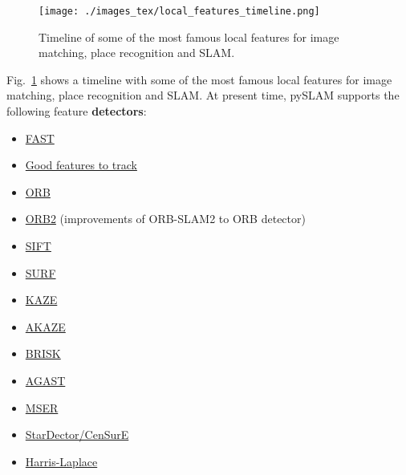 \documentclass{article}
\begin{document}
\begin{figure}[!t]
\begin{center}
    \texttt{[image: ./images\_tex/local\_features\_timeline.png]}
\end{center}
\caption{Timeline of some of the most famous local features for image matching, place recognition and SLAM.}
\label{Fig_TimelineLocalFeatures}
\end{figure}

Fig.~\ref{Fig_TimelineLocalFeatures} shows a timeline with some of the most famous local features for image matching, place recognition and SLAM. At present time, pySLAM supports the following feature \textbf{detectors}:

\begin{itemize}
    \item \href{https://www.edwardrosten.com/work/fast.html}{FAST} \cite{rosten2006machine}
    \item \href{https://ieeexplore.ieee.org/document/323794}{Good features to track} \cite{shi1994good}
    \item \href{http://www.willowgarage.com/sites/default/files/orb_final.pdf}{ORB} \cite{rublee2011orb}
    \item \href{https://github.com/raulmur/ORB_SLAM2}{ORB2} (improvements of ORB-SLAM2 to ORB detector)
    \item \href{https://www.cs.ubc.ca/~lowe/papers/iccv99.pdf}{SIFT} \cite{lowe1999object}
    \item \href{http://people.ee.ethz.ch/~surf/eccv06.pdf}{SURF} \cite{bay2006surf}
    \item \href{https://www.doc.ic.ac.uk/~ajd/Publications/alcantarilla_etal_eccv2012.pdf}{KAZE} \cite{alcantarilla2012kaze}
    \item \href{http://www.bmva.org/bmvc/2013/Papers/paper0013/paper0013.pdf}{AKAZE} \cite{alcantarilla2013fast}
    \item \href{http://www.margaritachli.com/papers/ICCV2011paper.pdf}{BRISK} \cite{leutenegger2011brisk}
    \item \href{http://www.i6.in.tum.de/Main/ResearchAgast}{AGAST}
    \item \href{http://cmp.felk.cvut.cz/~matas/papers/matas-bmvc02.pdf}{MSER} \cite{matas2002robust}
    \item \href{https://link.springer.com/content/pdf/10.1007%2F978-3-540-88693-8_8.pdf}{StarDector/CenSurE}
    \item \href{https://www.robots.ox.ac.uk/~vgg/research/affine/det_eval_files/mikolajczyk_ijcv2004.pdf}{Harris-Laplace}

\end{itemize}
\end{document}
